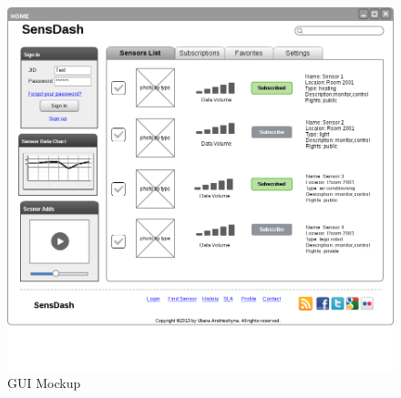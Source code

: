    \begin{figure}[!ht]
    \centering
    \includegraphics[scale=0.5]{images/Mockup.png}   
    \caption[GUI Mockup]{GUI Mockup}
    \label{img:GUI Mockup}                           
    \end{figure}

